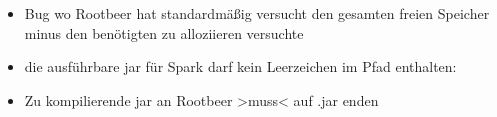 \begin{frame}[fragile]
\begin{itemize}
        \item Bug wo Rootbeer hat standardmäßig versucht den gesamten freien Speicher minus den benötigten zu alloziieren versuchte
        \item die ausführbare jar für Spark darf kein Leerzeichen im Pfad enthalten:
        \item Zu kompilierende jar an Rootbeer >muss< auf .jar enden
      \end{itemize}
\end{frame}



